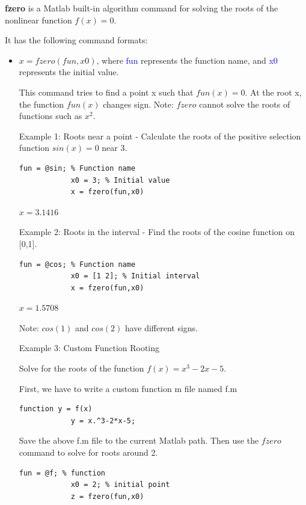 \documentclass[10pt,math=newtx,citestyle=gb7714-2015,bibstyle=gb7714-2015]{elegantbook}
\begin{document}
{{{	\textbf{fzero} is a Matlab built-in algorithm command for solving the roots of the nonlinear function $f(x)=0$.
	
	It has the following command formats:
	\begin{itemize}
		\item $x=fzero(fun,x0)$, where \textcolor{blue}{fun} represents the function name, and \textcolor{blue}{x0} represents the initial value.
		
		This command tries to find a point x such that $fun(x)=0$. At the root x, the function $fun(x)$ changes sign. Note: $fzero$ cannot solve the roots of functions such as $x^2$.
		
		Example 1: Roots near a point - Calculate the roots of the positive selection function $sin(x)=0$ near 3.
		
		\begin{lstlisting}[frame=shadowbox]
			fun = @sin; % Function name
			x0 = 3; % Initial value
			x = fzero(fun,x0)
		\end{lstlisting}
		
		$x=3.1416$
		
		Example 2: Roots in the interval - Find the roots of the cosine function on [0,1].
		
		\begin{lstlisting}[frame=shadowbox]
			fun = @cos; % Function name
			x0 = [1 2]; % Initial interval
			x = fzero(fun,x0)
		\end{lstlisting}
		
		$x=1.5708$
		
		Note: $cos(1)$ and $cos(2)$ have different signs.
		
		Example 3: Custom Function Rooting
		
		Solve for the roots of the function $f(x)=x^3-2x-5$.
		
		First, we have to write a custom function m file named f.m
		
		\begin{lstlisting}[frame=shadowbox]
			function y = f(x)
			y = x.^3-2*x-5;
		\end{lstlisting}
		
		Save the above f.m file to the current Matlab path. Then use the $fzero$ command to solve for roots around 2.
		
		\begin{lstlisting}[frame=shadowbox]
			fun = @f; % function
			x0 = 2; % initial point
			z = fzero(fun,x0)
		\end{lstlisting}
		

\end{itemize}}}}
\end{document}
